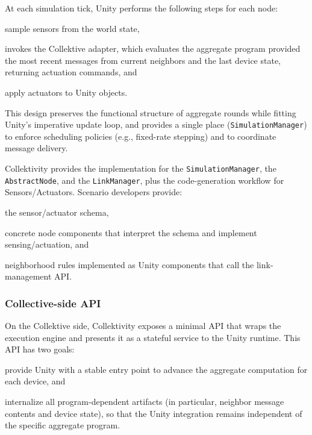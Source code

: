 \documentclass[runningheads]{llncs}
\newenvironment{inlinelist}{\begin{enumerate*}[label=\emph{(\roman*)}]}{\end{enumerate*}}
\begin{document}
At each simulation tick, Unity performs the following steps for each node:
\begin{inlinelist}
    \item sample sensors from the world state,
    \item invokes the Collektive adapter,
    which evaluates the aggregate program provided the most recent messages from current neighbors and the last device state,
    returning actuation commands,
    and
    \item apply actuators to Unity objects.
\end{inlinelist}
%
This design preserves the functional structure of aggregate rounds while fitting Unity's imperative update loop, and provides a single place
(\texttt{SimulationManager}) to enforce scheduling policies (e.g., fixed-rate stepping) and to coordinate message delivery.

Collektivity provides the implementation for the \texttt{SimulationManager}, the \texttt{AbstractNode}, and the \texttt{LinkManager},
plus the code-generation workflow for Sensors/Actuators.
%
Scenario developers provide:
\begin{inlinelist}
    \item the sensor/actuator schema,
    \item concrete node components that interpret the schema and implement sensing/actuation, and
    \item neighborhood rules implemented as Unity components that call the link-management \ac{API}.
\end{inlinelist}

\subsubsection{Collective-side \ac{API}}\label{subsec:collective-api}

On the Collektive side, Collektivity exposes a minimal \ac{API} that wraps the execution engine and
presents it as a stateful service to the Unity runtime.
This \ac{API} has two goals:
\begin{inlinelist}
    \item provide Unity with a stable entry point to advance the aggregate computation for each device, and
    \item internalize all program-dependent artifacts (in particular, neighbor message contents and device state),
    so that the Unity integration remains independent of the specific aggregate program.
\end{inlinelist}
\end{document}
